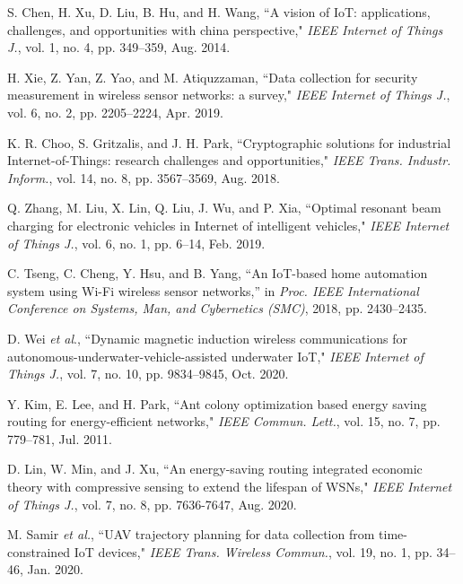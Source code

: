 \documentclass[journal]{IEEEtran}
\begin{document}
\begin{thebibliography}{1}

          S. Chen, H. Xu, D. Liu, B. Hu, and H. Wang, ``A vision of IoT: applications, challenges, and opportunities with china perspective," \emph{IEEE Internet of Things J.}, vol. 1, no. 4, pp. 349--359, Aug. 2014.

          H. Xie, Z. Yan, Z. Yao, and M. Atiquzzaman, ``Data collection for security measurement in wireless sensor networks: a survey," \emph{IEEE Internet of Things J.}, vol. 6, no. 2, pp. 2205--2224, Apr. 2019.


         K. R. Choo, S. Gritzalis, and J. H. Park, ``Cryptographic solutions for industrial Internet-of-Things: research challenges and opportunities," \emph{IEEE Trans. Industr. Inform.}, vol. 14, no. 8, pp. 3567--3569, Aug. 2018.


         Q. Zhang, M. Liu, X. Lin, Q. Liu, J. Wu, and P. Xia, ``Optimal resonant beam charging for electronic vehicles in Internet of intelligent vehicles," \emph{IEEE Internet of Things J.}, vol. 6, no. 1, pp. 6--14, Feb. 2019.


         C. Tseng, C. Cheng, Y. Hsu, and B. Yang, ``An IoT-based home automation system using Wi-Fi wireless sensor networks,'' in \emph{Proc. IEEE International Conference on Systems, Man, and Cybernetics (SMC)}, 2018, pp. 2430--2435.


         D. Wei \emph{et al}., ``Dynamic magnetic induction wireless communications for autonomous-underwater-vehicle-assisted underwater IoT," \emph{IEEE Internet of Things J.}, vol. 7, no. 10, pp. 9834--9845, Oct. 2020.


        Y. Kim, E. Lee, and H. Park, ``Ant colony optimization based energy saving routing for energy-efficient networks," \emph{IEEE Commun. Lett.}, vol. 15, no. 7, pp. 779--781, Jul. 2011.


        D. Lin, W. Min, and J. Xu, ``An energy-saving routing integrated economic theory with compressive sensing to extend the lifespan of WSNs," \emph{IEEE Internet of Things J.}, vol. 7, no. 8, pp. 7636-7647, Aug. 2020.


        M. Samir \emph{et al.}, ``UAV trajectory planning for data collection from time-constrained IoT devices," \emph{IEEE Trans. Wireless Commun.}, vol. 19, no. 1, pp. 34--46, Jan. 2020.






\end{thebibliography}
\end{document}
